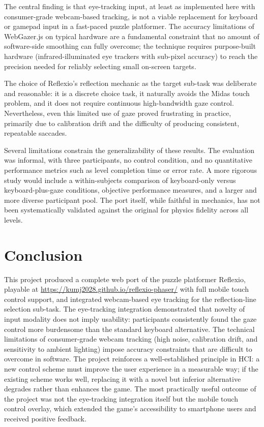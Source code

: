 \documentclass[11pt,twocolumn]{article}
\begin{document}
The central finding is that eye-tracking input, at least as implemented here
with consumer-grade webcam-based tracking, is not a viable replacement for
keyboard or gamepad input in a fast-paced puzzle platformer. The accuracy
limitations of WebGazer.js on typical hardware are a fundamental constraint
that no amount of software-side smoothing can fully overcome; the technique
requires purpose-built hardware (infrared-illuminated eye trackers with
sub-pixel accuracy) to reach the precision needed for reliably selecting small
on-screen targets.

The choice of Reflexio's reflection mechanic as the target sub-task was
deliberate and reasonable: it is a discrete choice task, it naturally avoids
the Midas touch problem, and it does not require continuous high-bandwidth
gaze control. Nevertheless, even this limited use of gaze proved frustrating in
practice, primarily due to calibration drift and the difficulty of producing
consistent, repeatable saccades.

Several limitations constrain the generalizability of these results. The
evaluation was informal, with three participants, no control condition, and no
quantitative performance metrics such as level completion time or error rate.
A more rigorous study would include a within-subjects comparison of keyboard-only
versus keyboard-plus-gaze conditions, objective performance measures, and a
larger and more diverse participant pool. The port itself, while faithful in
mechanics, has not been systematically validated against the original for
physics fidelity across all levels.

\section{Conclusion}

This project produced a complete web port of the puzzle platformer Reflexio,
playable at \url{https://kumj2028.github.io/reflexio-phaser/} with full mobile
touch control support, and integrated webcam-based eye tracking for the
reflection-line selection sub-task. The eye-tracking integration demonstrated
that novelty of input modality does not imply usability: participants
consistently found the gaze control more burdensome than the standard keyboard
alternative. The technical limitations of consumer-grade webcam tracking (high
noise, calibration drift, and sensitivity to ambient lighting) impose accuracy
constraints that are difficult to overcome in software. The project reinforces
a well-established principle in HCI: a new control scheme must improve the user
experience in a measurable way; if the existing scheme works well, replacing it
with a novel but inferior alternative degrades rather than enhances the game.
The most practically useful outcome of the project was not the eye-tracking
integration itself but the mobile touch control overlay, which extended the
game's accessibility to smartphone users and received positive feedback.
\end{document}
